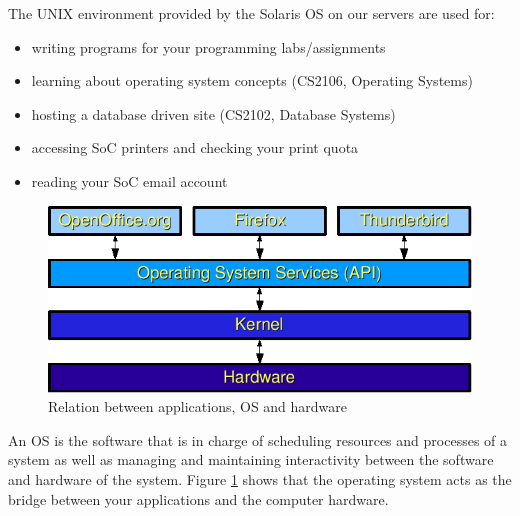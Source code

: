 \begin{frame}
The UNIX environment provided by the Solaris OS on our servers are used for:
\begin{itemize}
\item writing programs for your programming labs/assignments
\item learning about operating system concepts (CS2106, Operating Systems)
\item hosting a database driven site (CS2102, Database Systems)
\item accessing SoC printers and checking your print quota
\item reading your SoC email account
\end{itemize}
\end{frame}

\begin{frame}
\begin{figure}
\begin{center}
\includegraphics[width=0.7\linewidth]{os-layers}
\end{center}
\caption{Relation between applications, OS and hardware}
\label{fig:os}
\end{figure}
\end{frame}

An OS is the software that is in charge of scheduling resources and processes 
of a system as well as managing and maintaining interactivity between the
software and hardware of the system. Figure \ref{fig:os} shows that the
operating system acts as the bridge between your applications and the computer
hardware.  
